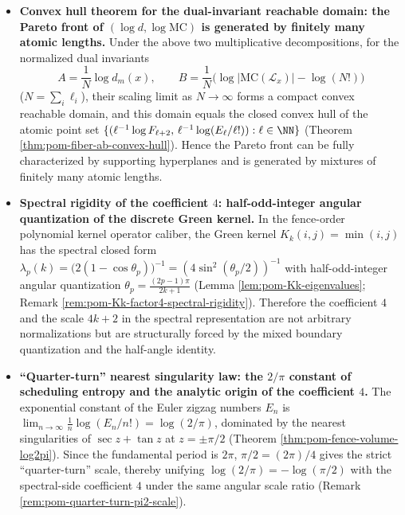 \begin{enumerate}
\begin{itemize}
    \item \textbf{Convex hull theorem for the dual-invariant reachable domain: the Pareto front of \texorpdfstring{\((\log d,\log\mathrm{MC})\)}{(log d, log MC)} is generated by finitely many atomic lengths.}
    Under the above two multiplicative decompositions, for the normalized dual invariants
    \[
    A=\frac{1}{N}\log d_m(x),\qquad
    B=\frac{1}{N}\bigl(\log|\mathrm{MC}(\mathcal L_x)|-\log(N!)\bigr)
    \]
    (\(N=\sum_i\ell_i\)), their scaling limit as \(N\to\infty\) forms a compact convex reachable domain, and this domain equals the closed convex hull of the atomic point set
    \(
    \{(\ell^{-1}\log F_{\ell+2},\,\ell^{-1}\log(E_\ell/\ell!)):\ell\in\NN\}
    \)
    (Theorem \ref{thm:pom-fiber-ab-convex-hull}).
    Hence the Pareto front can be fully characterized by supporting hyperplanes and is generated by mixtures of finitely many atomic lengths.

    \item \textbf{Spectral rigidity of the coefficient \(4\): half-odd-integer angular quantization of the discrete Green kernel.}
    In the fence-order polynomial kernel operator caliber, the Green kernel
    \(K_k(i,j)=\min(i,j)\) has the spectral closed form
    \(
    \lambda_p(k)=\bigl(2(1-\cos\theta_p)\bigr)^{-1}=(4\sin^2(\theta_p/2))^{-1}
    \)
    with half-odd-integer angular quantization
    \(
    \theta_p=\frac{(2p-1)\pi}{2k+1}
    \)
    (Lemma \ref{lem:pom-Kk-eigenvalues}; Remark \ref{rem:pom-Kk-factor4-spectral-rigidity}).
    Therefore the coefficient \(4\) and the scale \(4k+2\) in the spectral representation are not arbitrary normalizations but are structurally forced by the mixed boundary quantization and the half-angle identity.

    \item \textbf{``Quarter-turn'' nearest singularity law: the \texorpdfstring{\(2/\pi\)}{2/pi} constant of scheduling entropy and the analytic origin of the coefficient \(4\).}
    The exponential constant of the Euler zigzag numbers \(E_n\) is
    \(
    \lim_{n\to\infty}\frac1n\log(E_n/n!)=\log(2/\pi)
    \),
    dominated by the nearest singularities of \(\sec z+\tan z\) at \(z=\pm\pi/2\) (Theorem \ref{thm:pom-fence-volume-log2pi}).
    Since the fundamental period is \(2\pi\), \(\pi/2=(2\pi)/4\) gives the strict ``quarter-turn'' scale,
    thereby unifying \(\log(2/\pi)=-\log(\pi/2)\) with the spectral-side coefficient \(4\) under the same angular scale ratio (Remark \ref{rem:pom-quarter-turn-pi2-scale}).


\end{itemize}
\end{enumerate}
